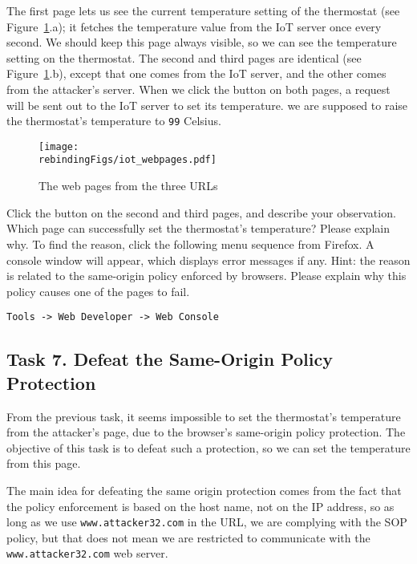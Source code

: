  
The first page lets us see the current temperature setting of the thermostat (see
Figure~\ref{rebinding:fig:webpages}.a); it fetches
the temperature value from the IoT server once every second. We should keep this page always
visible, so we can see the temperature setting on the thermostat. 
The second and third pages
are identical (see Figure~\ref{rebinding:fig:webpages}.b), 
except that one comes from the IoT server, and the other comes from
the attacker's server. When we click the button on both pages, 
a request will be sent out to the IoT server to set its temperature. 
we are supposed to raise the thermostat's temperature 
to \texttt{99} Celsius.  


\begin{figure}[htb]
\begin{center}
\texttt{[image: \\rebindingFigs/iot\_webpages.pdf]}
\end{center}
\caption{The web pages from the three URLs}
\label{rebinding:fig:webpages}
\end{figure}
 

Click the button on the second and third pages, and describe your observation. Which page
can successfully set the thermostat's temperature? Please explain why. 
To find the reason, click the following menu sequence from Firefox. A console window will appear,
which displays error messages if any. Hint: the reason is related to the same-origin policy 
enforced by browsers. Please explain why this policy causes one of the pages to fail.
 
\begin{lstlisting}
Tools -> Web Developer -> Web Console
\end{lstlisting}
  



\subsection{Task 7. Defeat the Same-Origin Policy Protection}


From the previous task, it seems impossible to
set the thermostat's temperature from the attacker's
page, due to the browser's   
same-origin policy protection.  The objective of this task
is to defeat such a protection, so we can set the 
temperature from this page. 


The main idea for defeating the same origin protection 
comes from the fact that the policy enforcement is 
based on the host name, not on the IP address, so as long as 
we use \texttt{www.attacker32.com} in the URL, we are complying with
the SOP policy, but that does not mean we are restricted 
to communicate with the \texttt{www.attacker32.com} web server.  


